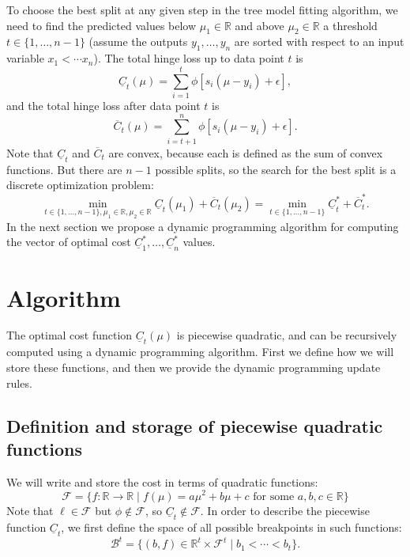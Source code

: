 \documentclass{article}
\begin{document}
To choose the best split at any given step in the tree model fitting
algorithm, we need to find the predicted values below
$\mu_1\in\mathbb R$ and above $\mu_2\in\mathbb R$ a threshold
$t\in\{1,\dots,n-1\}$ (assume the outputs $y_1,\dots,y_n$ are sorted
with respect to an input variable $x_1<\cdots x_n$).  The total hinge
loss up to data point $t$ is
\begin{equation}
  \label{eq:underline_C}
  \underline C_t(\mu) = \sum_{i=1}^t \phi[s_i(\mu-y_i)+\epsilon],
\end{equation}
and the total hinge loss after data point $t$ is
\begin{equation}
  \label{eq:overline_C}
  \overline C_t(\mu) = \sum_{i=t+1}^n \phi[s_i(\mu-y_i)+\epsilon].
\end{equation}
Note that $\underline C_t$ and $\overline C_t$ are convex, because
each is defined as the sum of convex functions. But there are $n-1$
possible splits, so the search for the best split is a discrete
optimization problem:
\begin{equation}
  \label{eq:min_hinge_loss}
  \min_{
    t\in\{1,\dots,n-1\},
    \mu_1\in\mathbb R,
    \mu_2\in\mathbb R
  }
  \underline C_t(\mu_1) + \overline C_t(\mu_2) = 
  \min_{
    t\in\{1,\dots,n-1\}
  }
  \underline{ C}^*_t + \overline C^*_t.
\end{equation}
In the next section we propose a dynamic programming algorithm for
computing the vector of optimal cost
$\underline{ C}^*_1,\dots,\underline{ C}^*_n$ values.

\section{Algorithm}

The optimal cost function $\underline C_t(\mu)$ is piecewise
quadratic, and can be recursively computed using a dynamic programming
algorithm. First we define how we will store these functions, and then
we provide the dynamic programming update rules.

\subsection{Definition and storage of piecewise quadratic functions}
We will write and store the cost in terms of quadratic
functions:
\begin{equation}
  \label{eq:F}
  \mathcal F = \{
  f:\mathbb R \rightarrow \mathbb R\mid
  f(\mu) = a\mu^2 + b\mu + c 
  \text{ for some }a,b,c\in\mathbb R
  \}
\end{equation}
Note that $\ell\in\mathcal F$ but $\phi\not\in\mathcal F$, so
$\underline C_t\not\in \mathcal F$. In order to describe the piecewise
function $\underline C_t$, we first define the space of all
possible breakpoints in such functions:
\begin{equation}
  \label{eq:B^t}
  \mathcal B^t = \{
  (b,f)\in\mathbb R^t\times \mathcal F^t \mid
  b_1 < \cdots < b_t
  \}.
\end{equation}
\end{document}
